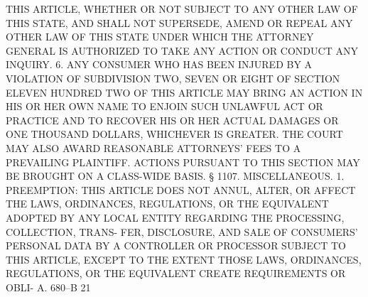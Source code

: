  THIS ARTICLE, WHETHER OR NOT SUBJECT TO ANY OTHER LAW OF THIS STATE, AND
 SHALL  NOT  SUPERSEDE, AMEND OR REPEAL ANY OTHER LAW OF THIS STATE UNDER
 WHICH THE ATTORNEY GENERAL IS AUTHORIZED TO TAKE ANY ACTION  OR  CONDUCT
 ANY INQUIRY.
   6.  ANY  CONSUMER  WHO  HAS BEEN INJURED BY A VIOLATION OF SUBDIVISION
 TWO, SEVEN OR EIGHT OF SECTION ELEVEN HUNDRED TWO OF  THIS  ARTICLE  MAY
 BRING  AN  ACTION  IN HIS OR HER OWN NAME TO ENJOIN SUCH UNLAWFUL ACT OR
 PRACTICE AND TO RECOVER HIS  OR  HER  ACTUAL  DAMAGES  OR  ONE  THOUSAND
 DOLLARS,  WHICHEVER  IS  GREATER.  THE  COURT  MAY ALSO AWARD REASONABLE
 ATTORNEYS' FEES TO A PREVAILING PLAINTIFF.   ACTIONS  PURSUANT  TO  THIS
 SECTION MAY BE BROUGHT ON A CLASS-WIDE BASIS.
   §  1107.  MISCELLANEOUS.  1.  PREEMPTION: THIS ARTICLE DOES NOT ANNUL,
 ALTER, OR AFFECT THE LAWS, ORDINANCES, REGULATIONS,  OR  THE  EQUIVALENT
 ADOPTED BY ANY LOCAL ENTITY REGARDING THE PROCESSING, COLLECTION, TRANS-
 FER, DISCLOSURE, AND SALE OF CONSUMERS' PERSONAL DATA BY A CONTROLLER OR
 PROCESSOR  SUBJECT  TO  THIS  ARTICLE,  EXCEPT TO THE EXTENT THOSE LAWS,
 ORDINANCES, REGULATIONS, OR THE EQUIVALENT CREATE REQUIREMENTS OR  OBLI-
 A. 680--B                          21
 
